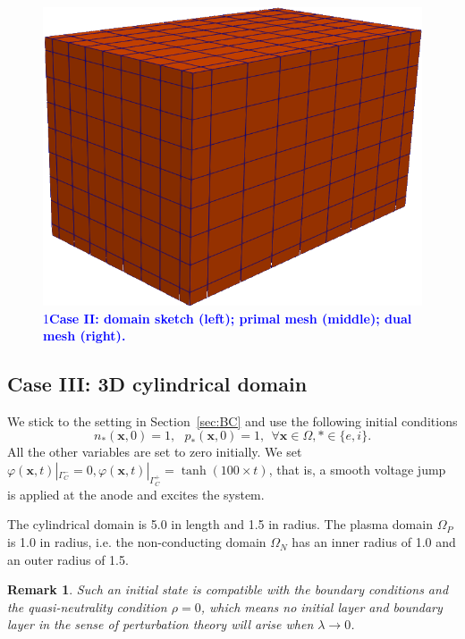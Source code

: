\documentclass{article}
\newtheorem*{remark}{Remark}
\def\ifUpdate{1}
\newcommand{\review}[1]{\textcolor{blue}{\if\ifUpdate1\textbf{#1}\fi}}
\begin{document}
\begin{figure}
    \hspace{1cm}
    \includegraphics[scale=0.2]{paper_version/figures/cube_mesh_dual.png}
    \caption{\review{Case II: domain sketch (left); primal mesh (middle); dual mesh (right).}}
    \label{fig:cube_domain_sketch}
\end{figure}


\subsection{Case III: 3D cylindrical domain}

We stick to the setting in Section~\ref{sec:BC} and use the following initial conditions
\begin{equation*}
    n_\ast(\mathbf{x}, 0) = 1, \ \ \  p_\ast(\mathbf{x},0) = 1, \ \ \forall \mathbf{x}\in\Omega, \ast \in \{e, i\}.
\end{equation*}
All the other variables are set to zero initially. We set $\varphi(\mathbf{x}, t)|_{\Gamma_C^-} = 0, \varphi(\mathbf{x}, t)|_{\Gamma_C^+} = \tanh(100\times t)$, that is, a smooth voltage jump is applied at the anode and excites the system. 

The cylindrical domain is 5.0 in length and 1.5 in radius. The plasma domain $\Omega_P$ is
1.0 in radius, i.e. the non-conducting domain $\Omega_N$ has an inner radius of 1.0 and an
outer radius of 1.5.

\begin{remark}
  Such an initial state is compatible with the boundary conditions and the quasi-neutrality
  condition $\rho = 0$, which means no initial layer and boundary layer in the sense of
  perturbation theory will arise when $\lambda \rightarrow 0$.
\end{remark}
\end{document}
